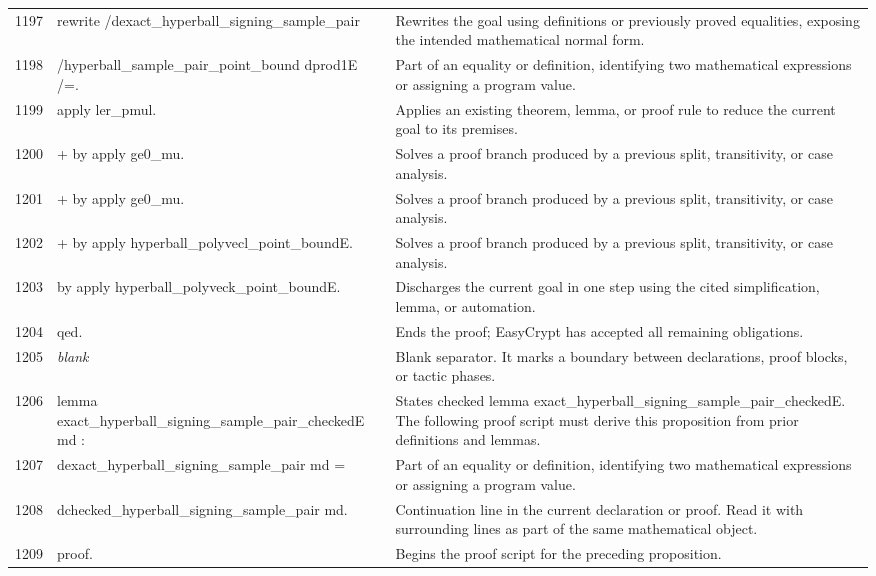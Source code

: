 \documentclass[10pt]{article}
\begin{document}
\begin{longtable}{r L{0.53\textwidth} L{0.37\textwidth}}
1197 & {\ttfamily\scriptsize rewrite /dexact\_hyperball\_signing\_sample\_pair} & Rewrites the goal using definitions or previously proved equalities, exposing the intended mathematical normal form. \\
1198 & {\ttfamily\scriptsize         /hyperball\_sample\_pair\_point\_bound dprod1E /=.} & Part of an equality or definition, identifying two mathematical expressions or assigning a program value. \\
1199 & {\ttfamily\scriptsize apply ler\_pmul.} & Applies an existing theorem, lemma, or proof rule to reduce the current goal to its premises. \\
1200 & {\ttfamily\scriptsize + by apply ge0\_mu.} & Solves a proof branch produced by a previous split, transitivity, or case analysis. \\
1201 & {\ttfamily\scriptsize + by apply ge0\_mu.} & Solves a proof branch produced by a previous split, transitivity, or case analysis. \\
1202 & {\ttfamily\scriptsize + by apply hyperball\_polyvecl\_point\_boundE.} & Solves a proof branch produced by a previous split, transitivity, or case analysis. \\
1203 & {\ttfamily\scriptsize by apply hyperball\_polyveck\_point\_boundE.} & Discharges the current goal in one step using the cited simplification, lemma, or automation. \\
1204 & {\ttfamily\scriptsize qed.} & Ends the proof; EasyCrypt has accepted all remaining obligations. \\
1205 & {\ttfamily\scriptsize \emph{blank}} & Blank separator.  It marks a boundary between declarations, proof blocks, or tactic phases. \\
1206 & {\ttfamily\scriptsize lemma exact\_hyperball\_signing\_sample\_pair\_checkedE md :} & States checked lemma exact\_hyperball\_signing\_sample\_pair\_checkedE.  The following proof script must derive this proposition from prior definitions and lemmas. \\
1207 & {\ttfamily\scriptsize   dexact\_hyperball\_signing\_sample\_pair md =} & Part of an equality or definition, identifying two mathematical expressions or assigning a program value. \\
1208 & {\ttfamily\scriptsize   dchecked\_hyperball\_signing\_sample\_pair md.} & Continuation line in the current declaration or proof.  Read it with surrounding lines as part of the same mathematical object. \\
1209 & {\ttfamily\scriptsize proof.} & Begins the proof script for the preceding proposition. \\

\end{longtable}
\end{document}
